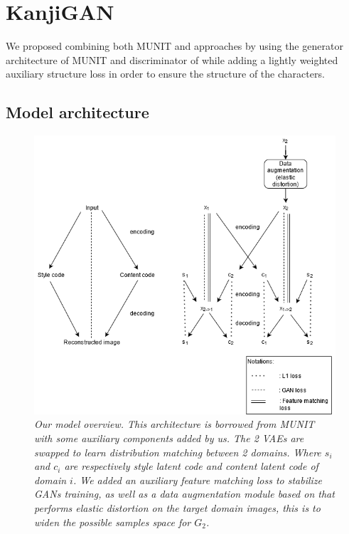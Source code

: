 \documentclass[12pt]{report}
\begin{document}
\section{KanjiGAN}

We proposed combining both MUNIT and \cite{ganimorph} approaches by using the generator architecture of MUNIT and discriminator of \cite{ganimorph} while adding a lightly weighted auxiliary structure loss in order to ensure the structure of the characters.

\subsection{Model architecture}

\begin{figure}[H]
	\centering
	\includegraphics[scale=0.7]{model-overview}
	\caption{\textit{Our model overview. This architecture is borrowed from MUNIT\cite{munit} with some auxiliary components added by us. The 2 VAEs are swapped to learn distribution matching between 2 domains. Where $s_i$ and $c_i$ are respectively style latent code and content latent code of domain $i$. We added an auxiliary feature matching loss to stabilize GANs training, as well as a data augmentation module based on \cite{augmentor} that performs elastic distortion on the target domain images, this is to widen the possible samples space for $G_2$.}}
	\label{fig:model-overview}
\end{figure}
\end{document}
